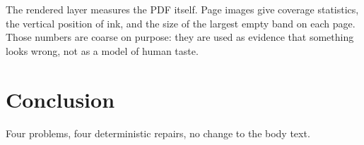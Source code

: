 \documentclass[10pt,a4paper]{article}
\begin{document}
The rendered layer measures the PDF itself. Page images give coverage statistics, the vertical position of ink, and the size of the largest empty band on each page. Those numbers are coarse on purpose: they are used as evidence that something looks wrong, not as a model of human taste.


\section{Conclusion}
Four problems, four deterministic repairs, no change to the body text.
\end{document}
